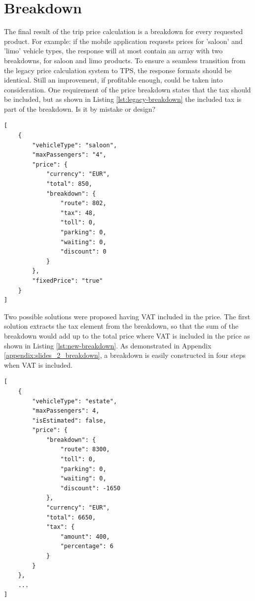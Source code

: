 %
\section{Breakdown}
The final result of the trip price calculation is a breakdown for every requested product. For example: if the mobile application requests prices for 'saloon' and 'limo' vehicle types, the response will at most contain an array with two breakdowns, for saloon and limo products. To ensure a seamless transition from the legacy price calculation system to TPS, the response formats should be identical. Still an improvement, if profitable enough, could be taken into consideration. One requirement of the price breakdown states that the tax should be included, but as shown in Listing \ref{lst:legacy-breakdown} the included tax is part of the breakdown. Is it by mistake or design?

\begin{lstlisting}[caption={Legacy price breakdown}, label={lst:legacy-breakdown}]
[
	{
		"vehicleType": "saloon",
		"maxPassengers": "4",
		"price": {
			"currency": "EUR",
			"total": 850,
			"breakdown": {
				"route": 802,
				"tax": 48,
				"toll": 0,
				"parking": 0,
				"waiting": 0,
				"discount": 0
			}
		},
		"fixedPrice": "true"
	}
]
\end{lstlisting}

Two possible solutions were proposed having VAT included in the price. The first solution extracts the tax element from the breakdown, so that the sum of the breakdown would add up to the total price where VAT is included in the price as shown in Listing \ref{lst:new-breakdown}. As demonstrated in Appendix \ref{appendix:slides_2_breakdown}, a breakdown is easily constructed in four steps when VAT is included.

\begin{lstlisting}[caption={Improved price breakdown}, label={lst:new-breakdown}]
[
	{
		"vehicleType": "estate",
		"maxPassengers": 4,
		"isEstimated": false,
		"price": {
			"breakdown": {
				"route": 8300,
				"toll": 0,
				"parking": 0,
				"waiting": 0,
				"discount": -1650
			},
			"currency": "EUR",
			"total": 6650,
			"tax": {
				"amount": 400,
				"percentage": 6
			}
		}
	},
	...
]
\end{lstlisting}

